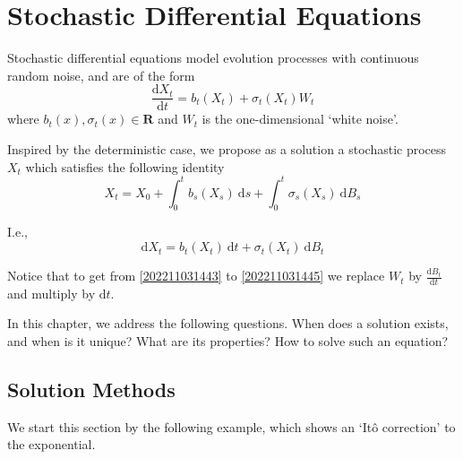 \chapter{Stochastic Differential Equations}

Stochastic differential equations model evolution processes with continuous random noise, and are of the form
\begin{equation}\label{202211031443}
    \frac{\mathrm{d} X_t}{\mathrm{d} t} = b_t(X_t) + \sigma_t(X_t) W_t
\end{equation}
where $b_t(x), \sigma_t(x) \in \textbf{R}$ and $W_t$ is the one-dimensional `white noise'.

Inspired by the deterministic case, we propose as a solution a stochastic process $X_t$ which satisfies the following identity
\begin{equation}\label{202211031444}
    X_t = X_0 + \int_0^t b_s(X_s)~\mathrm{d}s + \int_0^t \sigma_s(X_s)~\mathrm{d}B_s
\end{equation}

I.e.,
\begin{equation}\label{202211031445}
    \mathrm{d} X_t = b_t(X_t)~\mathrm{d}t + \sigma_t(X_t)~\mathrm{d}B_t
\end{equation}

Notice that to get from \eqref{202211031443} to \eqref{202211031445} we replace $W_t$ by $\frac{\mathrm{d}B_t}{\mathrm{d}t}$ and multiply by $\mathrm{d}t$.

In this chapter, we address the following questions. When does a solution exists, and when is it unique? What are its properties? How to solve such an equation?

\section{Solution Methods}

We start this section by the following example, which shows an `Itô correction' to the exponential.

